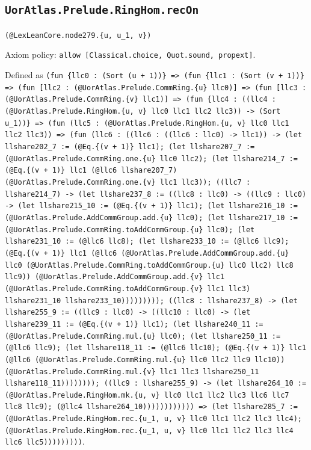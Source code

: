 \documentclass[11pt]{article}
\begin{document}
\subsection*{\texttt{UorAtlas.Prelude.RingHom.recOn}}
\noindent\texttt{(@LexLeanCore.node279.\{u, u\_1, v\})}\par
\noindent Axiom policy: \texttt{allow [Classical.choice, Quot.sound, propext]}.\par
\noindent Defined as \texttt{(fun \{llc0 : (Sort (u + 1))\} => (fun \{llc1 : (Sort (v + 1))\} => (fun [llc2 : (@UorAtlas.Prelude.CommRing.\{u\} llc0)] => (fun [llc3 : (@UorAtlas.Prelude.CommRing.\{v\} llc1)] => (fun \{llc4 : ((llc4 : (@UorAtlas.Prelude.RingHom.\{u, v\} llc0 llc1 llc2 llc3)) -> (Sort u\_1))\} => (fun (llc5 : (@UorAtlas.Prelude.RingHom.\{u, v\} llc0 llc1 llc2 llc3)) => (fun (llc6 : ((llc6 : ((llc6 : llc0) -> llc1)) -> (let llshare202\_7 := (@Eq.\{(v + 1)\} llc1); (let llshare207\_7 := (@UorAtlas.Prelude.CommRing.one.\{u\} llc0 llc2); (let llshare214\_7 := (@Eq.\{(v + 1)\} llc1 (@llc6 llshare207\_7) (@UorAtlas.Prelude.CommRing.one.\{v\} llc1 llc3)); ((llc7 : llshare214\_7) -> (let llshare237\_8 := ((llc8 : llc0) -> ((llc9 : llc0) -> (let llshare215\_10 := (@Eq.\{(v + 1)\} llc1); (let llshare216\_10 := (@UorAtlas.Prelude.AddCommGroup.add.\{u\} llc0); (let llshare217\_10 := (@UorAtlas.Prelude.CommRing.toAddCommGroup.\{u\} llc0); (let llshare231\_10 := (@llc6 llc8); (let llshare233\_10 := (@llc6 llc9); (@Eq.\{(v + 1)\} llc1 (@llc6 (@UorAtlas.Prelude.AddCommGroup.add.\{u\} llc0 (@UorAtlas.Prelude.CommRing.toAddCommGroup.\{u\} llc0 llc2) llc8 llc9)) (@UorAtlas.Prelude.AddCommGroup.add.\{v\} llc1 (@UorAtlas.Prelude.CommRing.toAddCommGroup.\{v\} llc1 llc3) llshare231\_10 llshare233\_10))))))))); ((llc8 : llshare237\_8) -> (let llshare255\_9 := ((llc9 : llc0) -> ((llc10 : llc0) -> (let llshare239\_11 := (@Eq.\{(v + 1)\} llc1); (let llshare240\_11 := (@UorAtlas.Prelude.CommRing.mul.\{u\} llc0); (let llshare250\_11 := (@llc6 llc9); (let llshare118\_11 := (@llc6 llc10); (@Eq.\{(v + 1)\} llc1 (@llc6 (@UorAtlas.Prelude.CommRing.mul.\{u\} llc0 llc2 llc9 llc10)) (@UorAtlas.Prelude.CommRing.mul.\{v\} llc1 llc3 llshare250\_11 llshare118\_11)))))))); ((llc9 : llshare255\_9) -> (let llshare264\_10 := (@UorAtlas.Prelude.RingHom.mk.\{u, v\} llc0 llc1 llc2 llc3 llc6 llc7 llc8 llc9); (@llc4 llshare264\_10)))))))))))) => (let llshare285\_7 := (@UorAtlas.Prelude.RingHom.rec.\{u\_1, u, v\} llc0 llc1 llc2 llc3 llc4); (@UorAtlas.Prelude.RingHom.rec.\{u\_1, u, v\} llc0 llc1 llc2 llc3 llc4 llc6 llc5)))))))))}.\par
\end{document}
